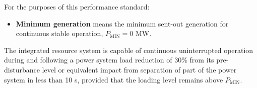 For the purposes of this performance standard:
\begin{itemize}
	\item \textbf{Minimum generation} means the minimum sent-out generation for continuous stable operation, $P_{\text{MIN}} = 0$ MW.
\end{itemize}

The integrated resource system is capable of continuous uninterrupted operation during and following a power system load reduction of 30\% from its pre-disturbance level or equivalent impact from separation of part of the power system in less than 10 s, provided that the loading level remains above $P_{\text{MIN}}$.
